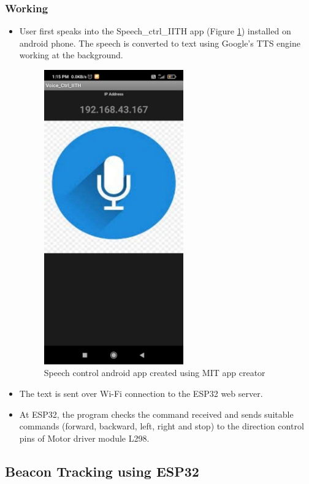 \subsubsection{Working}
\begin{itemize}
    \item User first speaks into the Speech\_ctrl\_IITH app (Figure \ref{Speech control app}) installed on android phone. The speech is converted to text using Google's TTS engine working at the background. 
    
    \begin{figure}[h!]
    \caption{Speech control android app created using MIT app creator}
    \label{Speech control app}
    \centering
    \includegraphics[width=6cm]{./Figures/Speech_ctrl_IITH.jpg}
    \end{figure}
    
    \item The text is sent over Wi-Fi connection to the ESP32 web server. 
    \item At ESP32, the program checks the command received and sends suitable commands (forward, backward, left, right and stop) to the direction control pins of Motor driver module L298.
\end{itemize}

\subsection{Beacon Tracking using ESP32} 
